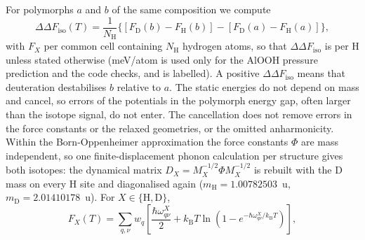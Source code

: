 \documentclass[aps,prmaterials,reprint,superscriptaddress,nofootinbib]{revtex4-2}
\newcommand{\ddF}{\Delta\Delta F_{\mathrm{iso}}}
\begin{document}
For polymorphs $a$ and $b$ of the same composition we compute
\begin{equation}
\ddF(T) = \frac{1}{N_{\mathrm{H}}}\Big\{\left[F_{\mathrm{D}}(b) - F_{\mathrm{H}}(b)\right] - \left[F_{\mathrm{D}}(a) - F_{\mathrm{H}}(a)\right]\Big\},
\label{eq:ddF}
\end{equation}
with $F_X$ per common cell containing $N_{\mathrm{H}}$ hydrogen atoms, so that $\ddF$ is per H unless stated otherwise (meV/atom is used only for the AlOOH pressure prediction and the code checks, and is labelled). A positive $\ddF$ means that deuteration destabilises $b$ relative to $a$. The static energies do not depend on mass and cancel, so errors of the potentials in the polymorph energy gap, often larger than the isotope signal, do not enter. The cancellation does not remove errors in the force constants or the relaxed geometries, or the omitted anharmonicity. Within the Born-Oppenheimer approximation the force constants $\Phi$ are mass independent, so one finite-displacement phonon calculation per structure gives both isotopes: the dynamical matrix $D_X = M_X^{-1/2}\Phi M_X^{-1/2}$ is rebuilt with the D mass on every H site and diagonalised again ($m_{\mathrm{H}} = 1.00782503$~u, $m_{\mathrm{D}} = 2.01410178$~u). For $X\in\{\mathrm{H},\mathrm{D}\}$,
\begin{equation}
F_X(T) = \sum_{q,\nu} w_q \left[\frac{\hbar\omega_{q\nu}^X}{2} + k_{\mathrm{B}}T \ln\left(1 - e^{-\hbar\omega_{q\nu}^X/k_{\mathrm{B}}T}\right)\right],
\label{eq:FX}
\end{equation}
\end{document}
